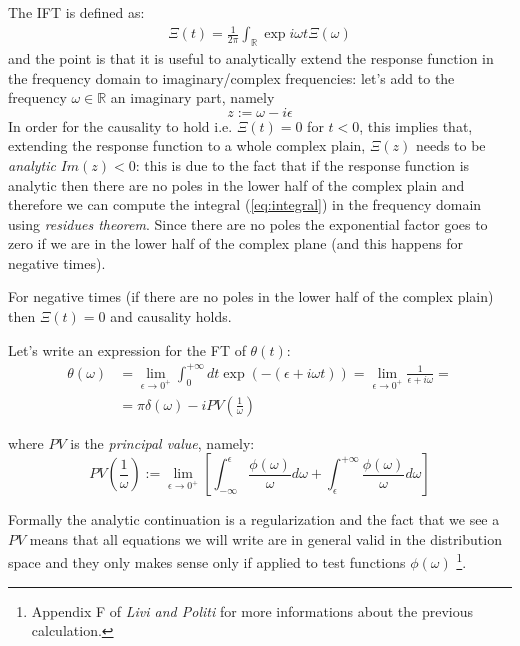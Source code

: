 \documentclass[\main/main.tex]{subfiles}
\begin{document}
The IFT is defined as:
\begin{align}
    \Xi(t)=\frac{1}{2\pi}\int_{\mathbb{R}}\exp{i\omega t}\Xi(\omega)
    \label{eq:integral}
\end{align}
and the point is that it is useful to analytically extend the response function in the frequency domain to imaginary/complex frequencies: let's add to the frequency $\omega \in \mathbb{R}$ an imaginary part, namely
\begin{equation}
    z:=\omega-i\epsilon
\end{equation}
In order for the causality to hold i.e. $\Xi(t)=0$ for $t<0$, this implies that, extending the response function to a whole complex plain, $\Xi(z)$ needs to be \textit{analytic} $Im(z)<0$: this is due to the fact that if the response function is analytic then there are no poles in the lower half of the complex plain and therefore we can compute the integral (\ref{eq:integral}) in the frequency domain using\textit{ residues theorem}. Since there are no poles the exponential factor goes to zero if we are in the lower half of the complex plane (and this happens for negative times).

For negative times (if there are no poles in the lower half of the complex plain) then $\Xi(t)=0$ and causality holds.

Let's write an expression for the FT of $\theta(t)$:
\begin{align}
    \theta(\omega)&=\lim_{\epsilon\to0^+}\int_{0}^{+\infty} dt \exp (-(\epsilon + i\omega t))=\lim_{\epsilon\to0^+}\frac{1}{\epsilon+i\omega} = \\
    &=\pi\delta(\omega)-iPV(\frac{1}{\omega})
     \label{eq:HFT}
\end{align}

where $PV$ is the \textit{principal value}, namely:
\begin{equation}
    PV(\frac{1}{\omega}):=\lim_{\epsilon\to 0^+}[\int_{-\infty}^\epsilon \frac{\phi(\omega)}{\omega}d\omega+\int_{\epsilon}^{+\infty}\frac{\phi(\omega)}{\omega}d\omega]
\end{equation}

Formally the analytic continuation is a regularization and the fact that we see a $PV$ means that all equations we will write are in general valid in the distribution space and they only makes sense only if applied to test functions $\phi(\omega)$ \footnote{Appendix F of \textit{Livi and Politi} for more informations about the previous calculation.}. \\
\end{document}
